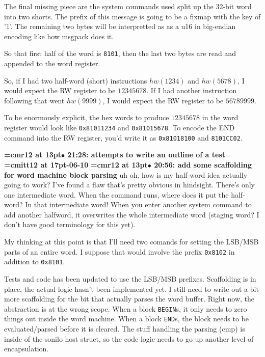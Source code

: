 The final missing piece are the system commands used split up the 32-bit word into two shorts. The prefix of this message is going to be a fixmap with the key of '1'. The remaining two bytes will be interpretted as as a u16 in big-endian encoding like how msgpack does it.
\par

So that first half of the word is {\tt 8101}, then the last two bytes are read and appended to the word register.
\par

So, if I had two half-word (short) instructions $hw(1234)$ and $hw(5678)$, I would expect the RW register to be $12345678$. If I had another instruction following that went $hw(9999)$, I would expect the RW register to be $56789999$.
\par

To be enormously explicit, the hex words to produce $12345678$ in the word register would look like {\tt 0x81011234} and {\tt 0x81015678}. To encode the END command into the RW register, you'd write it as {\tt 0x81018100} and {\tt 8101CC02}.
\par

{\smallskip\noindent\bf\font\titlefont=cmr12 at 13pt\titlefont $\bullet$ 21:28: attempts to write an outline of a test}\smallskip
{\medskip\noindent\bf\font\titlefont=cmitt12 at 17pt-06-10}\medskip
{\smallskip\noindent\bf\font\titlefont=cmr12 at 13pt\titlefont $\bullet$ 20:56: add some scaffolding for word machine block parsing}\smallskip
uh oh. how is my half-word idea actually going to work? I've found a flaw that's pretty obvious in hindsight. There's only one intermediate word. When the command runs, where does it put the half-word? In that intermediate word! When you enter another system command to add another halfword, it overwrites the whole intermediate word (staging word? I don't have good terminology for this yet).
\par

My thinking at this point is that I'll need two comands for setting the LSB/MSB parts of an entire word. I suppose that would involve the prefix {\tt 0x8102} in addition to {\tt 0x8101}.
\par

Tests and code has been updated to use the LSB/MSB prefixes. Scaffolding is in place, the actual logic hasn't been implemented yet. I still need to write out a bit more scaffolding for the bit that actually parses the word buffer. Right now, the abstraction is at the wrong scope. When a block {\tt BEGIN}s, it only needs to zero things out inside the word machine. When a block {\tt END}s, the block needs to be evaluated/parsed before it is cleared. The stuff handling the parsing (cmp) is inside of the sonilo host struct, so the code logic needs to go up another level of encapsulation.
\par


